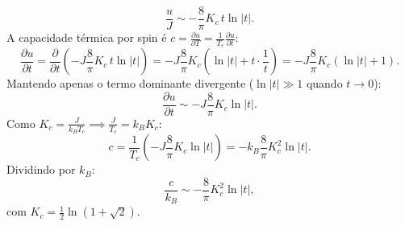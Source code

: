 \documentclass[11pt,a4paper]{article}
\begin{document}
%
\begin{equation}
    \boxed{\frac{u}{J} \sim -\frac{8}{\pi} K_c \, t \ln|t|.}
\end{equation}
%
A capacidade térmica por spin é $c = \frac{\partial u}{\partial T} = \frac{1}{T_c} \frac{\partial u}{\partial t}$:
%
\begin{equation}
    \frac{\partial u}{\partial t} = \frac{\partial}{\partial t} \left( -J \frac{8}{\pi} K_c \, t \ln|t| \right) 
    = -J \frac{8}{\pi} K_c \left( \ln|t| + t \cdot \frac{1}{t} \right) 
    = -J \frac{8}{\pi} K_c \left( \ln|t| + 1 \right).
\end{equation}
%
Mantendo apenas o termo dominante divergente ($\ln|t| \gg 1$ quando $t \to 0$):
%
\begin{equation}
    \frac{\partial u}{\partial t} \sim -J \frac{8}{\pi} K_c \ln|t|.
\end{equation}
%
Como $K_c = \frac{J}{k_B T_c} \implies \frac{J}{T_c} = k_B K_c$:
%
\begin{equation}
    c = \frac{1}{T_c} \left( -J \frac{8}{\pi} K_c \ln|t| \right) = -k_B \frac{8}{\pi} K_c^2 \ln|t|.
\end{equation}
%
Dividindo por $k_B$:
%
\begin{equation}
    \boxed{\frac{c}{k_B} \sim -\frac{8}{\pi} K_c^2 \ln|t|,}
\end{equation}
%
com $K_c = \frac{1}{2}\ln\left(1+\sqrt{2}\right)$.
%
\end{document}
